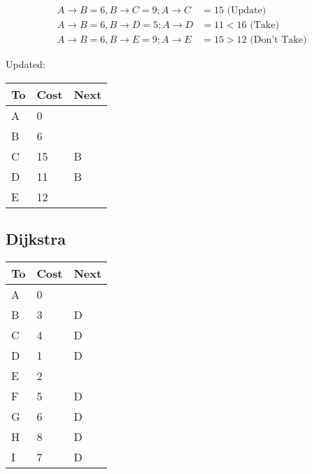 \documentclass{article}
\begin{document}
\begin{align*}
    A \rightarrow B = 6, B \rightarrow C = 9; A \rightarrow C & = 15 \text{ (Update)}          \\
    A \rightarrow B = 6, B \rightarrow D = 5; A\rightarrow D  & = 11 < 16\text{ (Take)}        \\
    A \rightarrow B = 6, B \rightarrow E = 9; A\rightarrow E  & = 15 > 12 \text{ (Don't Take)}
\end{align*}

Updated:

\begin{center}
    \begin{tabular}{@{}lll@{}}
        \toprule
        To & Cost & Next \\
        \midrule
        A  & 0    &      \\
        B  & 6    &      \\
        C  & 15   & B    \\
        D  & 11   & B    \\
        E  & 12   &      \\
        \bottomrule
    \end{tabular}
\end{center}

\subsection*{Dijkstra}
\begin{center}
    \begin{tabular}{@{}lll@{}}
        \toprule
        To & Cost & Next \\
        \midrule
        A  & 0    &      \\
        B  & 3    & D    \\
        C  & 4    & D    \\
        D  & 1    & D    \\
        E  & 2    &      \\
        F  & 5    & D    \\
        G  & 6    & D    \\
        H  & 8    & D    \\
        I  & 7    & D    \\
        \bottomrule
    \end{tabular}
\end{center}

\end{document}
